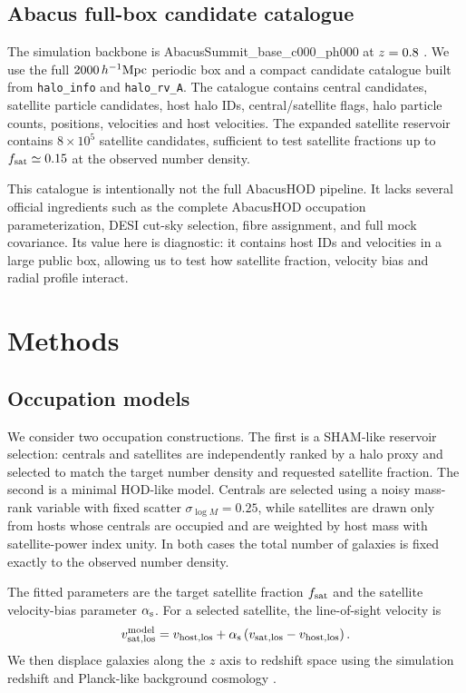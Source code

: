 \documentclass[fleqn,usenatbib]{mnras}
\newcommand{\fsat}{f_{\rm sat}}
\newcommand{\alphas}{\alpha_{\rm s}}
\newcommand{\hmpc}{h^{-1}{\rm Mpc}}
\begin{document}
\subsection{Abacus full-box candidate catalogue}

The simulation backbone is AbacusSummit\_base\_c000\_ph000 at $z=0.8$ \citep{Maksimova2021}.  We use the full $2000\,\hmpc$ periodic box and a compact candidate catalogue built from \texttt{halo\_info} and \texttt{halo\_rv\_A}.  The catalogue contains central candidates, satellite particle candidates, host halo IDs, central/satellite flags, halo particle counts, positions, velocities and host velocities.  The expanded satellite reservoir contains $8\times10^5$ satellite candidates, sufficient to test satellite fractions up to $\fsat\simeq0.15$ at the observed number density.

This catalogue is intentionally not the full AbacusHOD pipeline.  It lacks several official ingredients such as the complete AbacusHOD occupation parameterization, DESI cut-sky selection, fibre assignment, and full mock covariance.  Its value here is diagnostic: it contains host IDs and velocities in a large public box, allowing us to test how satellite fraction, velocity bias and radial profile interact.

\section{Methods}
\label{sec:methods}

\subsection{Occupation models}

We consider two occupation constructions.  The first is a SHAM-like reservoir selection: centrals and satellites are independently ranked by a halo proxy and selected to match the target number density and requested satellite fraction.  The second is a minimal HOD-like model.  Centrals are selected using a noisy mass-rank variable with fixed scatter $\sigma_{\log M}=0.25$, while satellites are drawn only from hosts whose centrals are occupied and are weighted by host mass with satellite-power index unity.  In both cases the total number of galaxies is fixed exactly to the observed number density.

The fitted parameters are the target satellite fraction $\fsat$ and the satellite velocity-bias parameter $\alphas$.  For a selected satellite, the line-of-sight velocity is
\begin{equation}
  v_{\rm sat,los}^{\rm model}
  = v_{\rm host,los} + \alphas\left(v_{\rm sat,los}-v_{\rm host,los}\right).
  \label{eq:velocitybias}
\end{equation}
We then displace galaxies along the $z$ axis to redshift space using the simulation redshift and Planck-like background cosmology \citep{Planck2020}.
\end{document}
